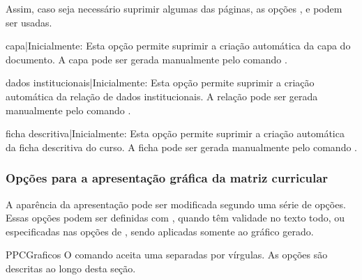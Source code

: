 \documentclass[a4paper, 11pt]{article}
\begin{document}
Assim, caso seja necessário suprimir algumas das páginas, as opções ,  e  podem ser usadas.

\begin{Optiondef}{capa}{|}{Inicialmente: }
    Esta opção permite suprimir a criação automática da capa do documento. A capa pode ser gerada manualmente pelo comando .
\end{Optiondef}

\begin{Optiondef}{dados institucionais}{|}{Inicialmente: }
    Esta opção permite suprimir a criação automática da relação de dados institucionais. A relação pode ser gerada manualmente pelo comando .
\end{Optiondef}

\begin{Optiondef}{ficha descritiva}{|}{Inicialmente: }
    Esta opção permite suprimir a criação automática da ficha descritiva do curso. A ficha pode ser gerada manualmente pelo comando .
\end{Optiondef}

\begin{PDListing}
\end{PDListing}

\subsubsection{Opções para a apresentação gráfica da matriz curricular}
A aparência da apresentação pode ser modificada segundo uma série de opções. Essas opções podem ser definidas com , quando têm validade no texto todo, ou especificadas nas opções de , sendo aplicadas somente ao gráfico gerado.

\begin{Macrodef}{PPCGraficos}{}{}
    O comando  aceita uma  separadas por vírgulas. As opções são descritas ao longo desta seção.
\end{Macrodef}
\end{document}
